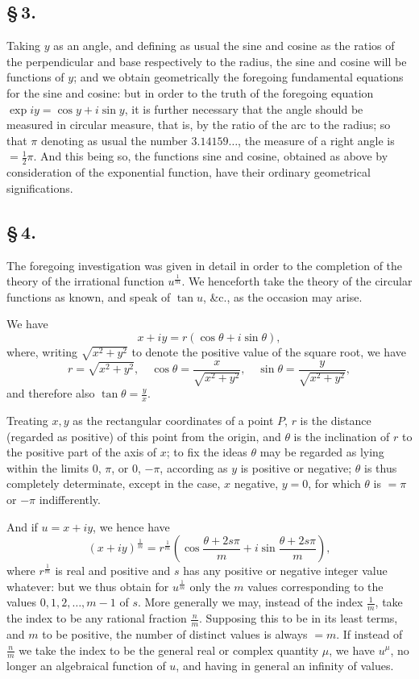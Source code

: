 \documentclass[11pt,a4paper]{article}
\begin{document}
\subsection*{\S\,3.}

Taking $y$ as an angle, and defining as usual the sine and cosine as the ratios of the perpendicular and base respectively to the radius, the sine and cosine will be functions of $y$; and we obtain geometrically the foregoing fundamental equations for the sine and cosine: but in order to the truth of the foregoing equation $\exp iy = \cos y + i\sin y$, it is further necessary that the angle should be measured in circular measure, that is, by the ratio of the arc to the radius; so that $\pi$ denoting as usual the number $3.14159\ldots$, the measure of a right angle is $= \frac{1}{2}\pi$. And this being so, the functions sine and cosine, obtained as above by consideration of the exponential function, have their ordinary geometrical significations.

\subsection*{\S\,4.}

The foregoing investigation was given in detail in order to the completion of the theory of the irrational function $u^{\frac{1}{m}}$. We henceforth take the theory of the circular functions as known, and speak of $\tan u$, \&c., as the occasion may arise.

We have
\[
x + iy = r(\cos\theta + i\sin\theta),
\]
where, writing $\sqrt{x^{2} + y^{2}}$ to denote the positive value of the square root, we have
\[
r = \sqrt{x^{2} + y^{2}}, \quad \cos\theta = \frac{x}{\sqrt{x^{2} + y^{2}}}, \quad \sin\theta = \frac{y}{\sqrt{x^{2} + y^{2}}},
\]
and therefore also $\tan\theta = \frac{y}{x}$.

Treating $x, y$ as the rectangular coordinates of a point $P$, $r$ is the distance (regarded as positive) of this point from the origin, and $\theta$ is the inclination of $r$ to the positive part of the axis of $x$; to fix the ideas $\theta$ may be regarded as lying within the limits $0$, $\pi$, or $0$, $-\pi$, according as $y$ is positive or negative; $\theta$ is thus completely determinate, except in the case, $x$ negative, $y = 0$, for which $\theta$ is $= \pi$ or $-\pi$ indifferently.

And if $u = x + iy$, we hence have
\[
(x + iy)^{\frac{1}{m}} = r^{\frac{1}{m}}\left(\cos\frac{\theta + 2s\pi}{m} + i\sin\frac{\theta + 2s\pi}{m}\right),
\]
where $r^{\frac{1}{m}}$ is real and positive and $s$ has any positive or negative integer value whatever: but we thus obtain for $u^{\frac{1}{m}}$ only the $m$ values corresponding to the values $0, 1, 2, \ldots, m - 1$ of $s$. More generally we may, instead of the index $\frac{1}{m}$, take the index to be any rational fraction $\frac{n}{m}$. Supposing this to be in its least terms, and $m$ to be positive, the number of distinct values is always $= m$. If instead of $\frac{n}{m}$ we take the index to be the general real or complex quantity $\mu$, we have $u^{\mu}$, no longer an algebraical function of $u$, and having in general an infinity of values.
\end{document}
